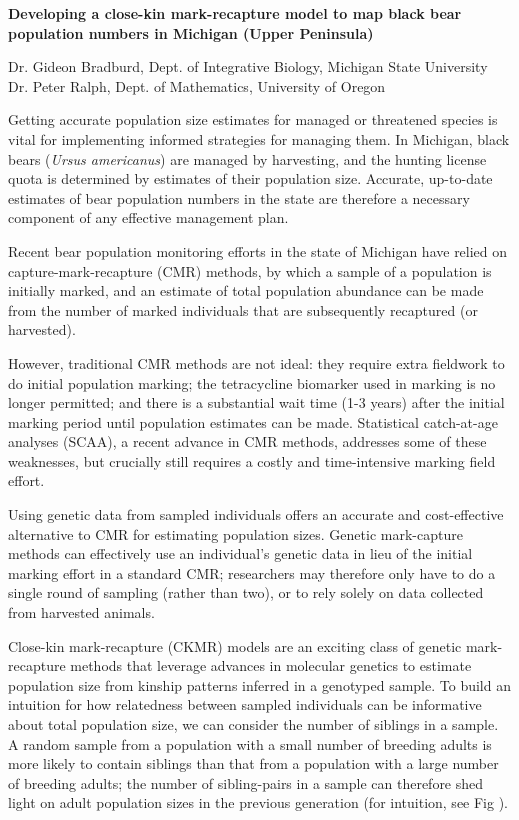 \documentclass[12pt]{article}
\newcommand{\gb}[1]{{\color{blue}{#1}}}
\begin{document}
%
\begin{center}
\textbf{Developing a close-kin mark-recapture model to map black bear population numbers in Michigan (Upper Peninsula)}
\end{center}
%            
\vspace{1em}

\noindent Dr. Gideon Bradburd, Dept. of Integrative Biology, Michigan State University\\
\noindent Dr. Peter Ralph, Dept. of Mathematics, University of Oregon

\vspace{1em}

\noindent Getting accurate population size estimates 
for managed or threatened species  
is vital for implementing informed strategies for managing them.
In Michigan, black bears (\textit{Ursus americanus}) 
are managed by harvesting, 
and the hunting license quota is determined by 
estimates of their population size.
Accurate, up-to-date estimates of 
bear population numbers in the state 
are therefore a necessary component 
of any effective management plan.

Recent bear population monitoring efforts 
in the state of Michigan have relied on 
capture-mark-recapture (CMR) methods, 
by which a sample of a population is initially marked, 
and an estimate of total population abundance 
can be made from the number of marked individuals 
that are subsequently recaptured (or harvested). 

However, traditional CMR methods are not ideal:  
they require extra fieldwork to do initial population marking; 
the tetracycline biomarker used in marking is no longer permitted; 
and there is a substantial wait time (1-3 years) after the 
initial marking period until population estimates can be made.
Statistical catch-at-age analyses (SCAA), 
a recent advance in CMR methods, 
addresses some of these weaknesses, 
but crucially still requires a costly and time-intensive 
marking field effort.

Using genetic data from sampled individuals 
offers an accurate and cost-effective alternative to CMR 
for estimating population sizes. 
Genetic mark-capture methods can effectively use 
an individual's genetic data in lieu of 
the initial marking effort in a standard CMR; 
researchers may therefore 
only have to do a single round of sampling 
(rather than two), 
or to rely solely on data collected from harvested animals.

Close-kin mark-recapture (CKMR) models 
are an exciting class of genetic mark-recapture methods 
that leverage advances in molecular genetics 
to estimate population size 
from kinship patterns inferred in a genotyped sample.
To build an intuition for how relatedness 
between sampled individuals can be informative 
about total population size, 
we can consider the number of siblings in a sample.
A random sample from a population 
with a small number of breeding adults 
is more likely to contain siblings than that 
from a population with a large number of breeding adults; 
the number of sibling-pairs in a sample can 
therefore shed light on adult population sizes 
in the previous generation 
(for intuition, see Fig \gb{XXX}).
\end{document}
